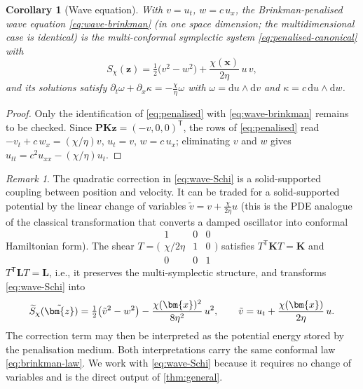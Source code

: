 \documentclass[11pt]{article}
\newtheorem{corollary}[theorem]{Corollary}
\theoremstyle{definition}
\theoremstyle{remark}
\newtheorem{remark}[theorem]{Remark}
\newcommand{\dd}{\mathrm{d}}
\newcommand{\bz}{\bm{z}}
\newcommand{\bx}{\bm{x}}
\newcommand{\bK}{\bm{K}}
\newcommand{\bL}{\bm{L}}
\newcommand{\bP}{\bm{P}}
\newcommand{\chixx}{\chi(\bx)}
\begin{document}
\begin{corollary}[Wave equation]
\label{cor:wave}
With $v=u_t$, $w=c\,u_x$, the Brinkman-penalised wave equation
\eqref{eq:wave-brinkman} (in one space dimension; the multidimensional
case is identical) is the multi-conformal symplectic system
\eqref{eq:penalised-canonical} with
\begin{equation}
\label{eq:wave-Schi}
S_\chi(\bz)
= \tfrac12\bigl(v^2-w^2\bigr)
+ \frac{\chixx}{2\eta}\,u\,v ,
\end{equation}
and its solutions satisfy
$\partial_t\omega+\partial_x\kappa=-\frac{\chi}{\eta}\omega$ with
$\omega=\dd u\wedge\dd v$ and $\kappa=c\,\dd u\wedge\dd w$.
\end{corollary}

\begin{proof}
Only the identification of \eqref{eq:penalised} with
\eqref{eq:wave-brinkman} remains to be checked.  Since
$\bP\bK\bz=(-v,0,0)^{\mathsf T}$, the rows of \eqref{eq:penalised}
read $-v_t+c\,w_x=(\chi/\eta)v$, $u_t=v$, $w=c\,u_x$; eliminating $v$
and $w$ gives $u_{tt}=c^2u_{xx}-(\chi/\eta)u_t$.
\end{proof}

\begin{remark}
\label{rem:shift}
The quadratic correction in \eqref{eq:wave-Schi} is a solid-supported
coupling between position and velocity.  It can be traded for a
solid-supported potential by the linear change of variables
$\tilde v = v + \frac{\chi}{2\eta}u$ (this is the PDE analogue of the
classical transformation that converts a damped oscillator into
conformal Hamiltonian form). The shear
$T=\bigl(\begin{smallmatrix}1&0&0\\ \chi/2\eta&1&0\\
0&0&1\end{smallmatrix}\bigr)$ satisfies $T^{\mathsf T}\bK T=\bK$ and
$T^{\mathsf T}\bL T=\bL$, i.e., it preserves the multi-symplectic
structure, and transforms \eqref{eq:wave-Schi} into
\begin{equation}
\label{eq:wave-Schi-shift}
\widetilde S_\chi(\tilde\bz)
= \tfrac12\bigl(\tilde v^2 - w^2\bigr)
- \frac{\chixx^{2}}{8\eta^{2}}\,u^{2},
\qquad
\tilde v = u_t + \frac{\chixx}{2\eta}\,u .
\end{equation}
The correction term may then be interpreted as the potential energy
stored by the penalisation medium.  Both interpretations carry the same
conformal law \eqref{eq:brinkman-law}. We work with
\eqref{eq:wave-Schi} because it requires no change of variables and is
the direct output of \cref{thm:general}.
\end{remark}
\end{document}
